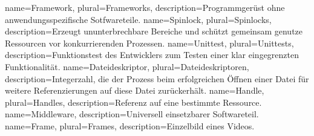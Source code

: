 \makeglossaries 

{
	name={Framework},  
	plural={Frameworks},
	description={Programmgerüst ohne anwendungsspezifische Sotfwareteile. \citep[S. 847]{gumm2011einfuhrung}}
}  
{
	name={Spinlock},  
	plural={Spinlocks},
	description={Erzeugt ununterbrechbare Bereiche und schützt gemeinsam genutze Ressourcen vor konkurrierenden Prozessen.  \citep[S. 261]{schroder2009embedded}}
}  
{
	name={Unittest},  
	plural={Unittests},
	description={Funktionstest des Entwicklers zum Testen einer klar eingegrenzten Funktionalität. \citep[S. 3]{hunt2004unit}}
}  
{
	name={Dateideskriptor},  
	plural={Dateideskriptoren},
	description={Integerzahl, die der Prozess beim erfolgreichen Öffnen einer Datei für weitere Referenzierungen auf diese Datei zurückerhält. \citep[S. 25]{beck1994linux}}
}  
{
	name={Handle},  
	plural={Handles},
	description={Referenz auf eine bestimmte Ressource.}
} 
{
	name={Middleware},  
	description={Universell einsetzbarer Softwareteil. \citep[S. 487]{sommerville2011software}}
} 
{
	name={Frame},
	plural={Frames},  
	description={Einzelbild eines Videos.}
} 